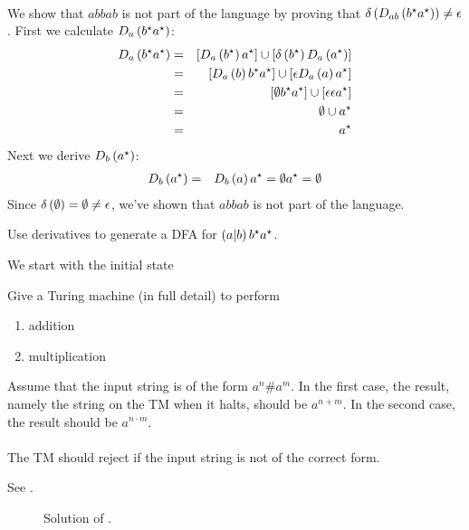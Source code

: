\documentclass{article}
\begin{document}
\begin{exercise}
\begin{answer}
\paragraph{}
We show that $abbab$ is not part of the language by proving that $\delta\left( D_{ab}\left( b^{\star}a^{\star} \right) \right)\neq\epsilon$. First we calculate $D_a\left( b^{\star}a^{\star} \right)$:
\begin{eqnarray}
D_a\left( b^{\star}a^{\star} \right)&=&\left[ D_a\left( b^{\star} \right)a^{\star} \right]\cup\left[ \delta\left( b^{\star} \right)D_a\left( a^{\star} \right) \right]\\
&=&\left[ D_a\left( b \right)b^{\star}a^{\star} \right]\cup\left[ \epsilon D_a\left( a \right)a^{\star} \right]\\
&=&\left[ \emptyset b^{\star}a^{\star} \right]\cup\left[ \epsilon\epsilon a^{\star} \right]\\
&=&\emptyset\cup a^{\star}\\
&=&a^{\star}
\end{eqnarray}
Next we derive $D_b\left( a^{\star} \right)$:
\begin{eqnarray}
D_b\left( a^{\star} \right)&=&D_b\left( a \right)a^{\star}=\emptyset a^{\star}=\emptyset
\end{eqnarray}
Since $\delta\left( \emptyset \right)=\emptyset\neq\epsilon$, we've shown that $abbab$ is not part of the language.
\end{answer}
\end{exercise}
\begin{exercise}
Use derivatives to generate a DFA for $\left( a|b \right)b^{\star}a^{\star}$.
\begin{answer}
We start with the initial state 
\end{answer}
\end{exercise}

\begin{exercise}
Give a Turing machine (in full detail) to perform
\begin{enumerate}
 \item addition
 \item multiplication
\end{enumerate}
Assume that the input string is of the form $a^n\#a^m$. In the first case, the result, namely the string on the TM when it halts, should be $a^{n+m}$. In the second case, the result should be $a^{n\cdot m}$.
\paragraph{}
The TM should reject if the input string is not of the correct form.
\begin{answer}
See .
\begin{figure}[hbt]
\centering
{}
\caption{Solution of .}
\end{figure}
\end{answer}
\end{exercise}
\end{document}
